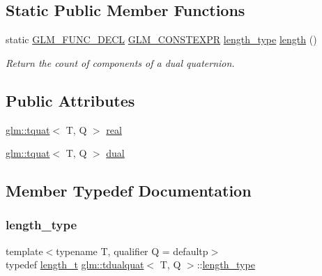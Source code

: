 \subsection*{Static Public Member Functions}
\begin{DoxyCompactItemize}
\item 
static \mbox{\hyperlink{setup_8hpp_ab2d052de21a70539923e9bcbf6e83a51}{G\+L\+M\+\_\+\+F\+U\+N\+C\+\_\+\+D\+E\+CL}} \mbox{\hyperlink{setup_8hpp_a08b807947b47031d3a511f03f89645ad}{G\+L\+M\+\_\+\+C\+O\+N\+S\+T\+E\+X\+PR}} \mbox{\hyperlink{structglm_1_1tdualquat_ad9fa4fd7f84d17bebd3efed6b5455d80}{length\+\_\+type}} \mbox{\hyperlink{structglm_1_1tdualquat_a79fe24c72a3f26d906b080de34b92b4e}{length}} ()
\begin{DoxyCompactList}\small\item\em Return the count of components of a dual quaternion. \end{DoxyCompactList}\end{DoxyCompactItemize}
\subsection*{Public Attributes}
\begin{DoxyCompactItemize}
\item 
\mbox{\hyperlink{structglm_1_1tquat}{glm\+::tquat}}$<$ T, Q $>$ \mbox{\hyperlink{structglm_1_1tdualquat_a25909f92feb14a77756d2e83f9ec0b20}{real}}
\item 
\mbox{\hyperlink{structglm_1_1tquat}{glm\+::tquat}}$<$ T, Q $>$ \mbox{\hyperlink{structglm_1_1tdualquat_a6e9bac4577ea5ff7e47104c183f3955a}{dual}}
\end{DoxyCompactItemize}


\subsection{Member Typedef Documentation}
\mbox{\label{structglm_1_1tdualquat_ad9fa4fd7f84d17bebd3efed6b5455d80}} 
\subsubsection{\texorpdfstring{length\+\_\+type}{length\_type}}
{\footnotesize\ttfamily template$<$typename T, qualifier Q = defaultp$>$ \\
typedef \mbox{\hyperlink{namespaceglm_a090a0de2260835bee80e71a702492ed9}{length\+\_\+t}} \mbox{\hyperlink{structglm_1_1tdualquat}{glm\+::tdualquat}}$<$ T, Q $>$\+::\mbox{\hyperlink{structglm_1_1tdualquat_ad9fa4fd7f84d17bebd3efed6b5455d80}{length\+\_\+type}}}


